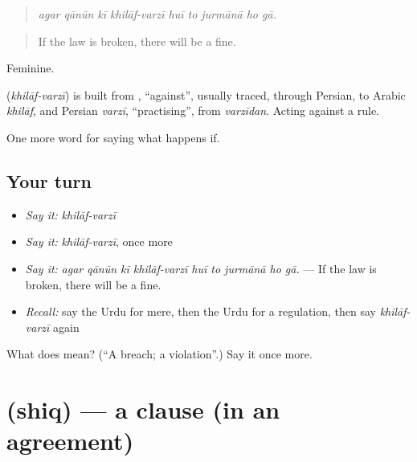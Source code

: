 \begin{quote}
         
\end{quote}

\begin{quote}
\emph{agar qānūn kī khilāf-varzī huī to jurmānā ho gā.}
\end{quote}

\begin{quote}
If the law is broken, there will be a fine.
\end{quote}

Feminine.

\begin{cousinweb}
\textbf{ } (\emph{khilāf-varzī}) is built from \textbf{}, \textquotedblleft{}against\textquotedblright{}, usually traced, through Persian, to Arabic \emph{khilāf}, and Persian \emph{varzī}, \textquotedblleft{}practising\textquotedblright{}, from \emph{varzīdan}. Acting against a rule.
\end{cousinweb}

\begin{grammarlens}[title={What you've built}]
One more word for saying what happens if.
\end{grammarlens}

\subsection*{Your turn}
\begin{itemize}
\raggedright
  \item \emph{Say it:} \emph{khilāf-varzī}
  \item \emph{Say it:} \emph{khilāf-varzī}, once more
  \item \emph{Say it:} \emph{agar qānūn kī khilāf-varzī huī to jurmānā ho gā.} — If the law is broken, there will be a fine.
  \item \emph{Recall:} say the Urdu for mere, then the Urdu for a regulation, then say \emph{khilāf-varzī} again
\end{itemize}

\begin{tcolorbox}[breakable,colback=teal!4,colframe=teal!35!black,title={Before you move on}]
What does   mean? (\textquotedblleft{}A breach; a violation\textquotedblright{}.) Say it once more.
\end{tcolorbox}
\section[\texorpdfstring{\ur{شق} (shiq)}{شق (shiq)}]{ (shiq) — a clause (in an agreement)}

